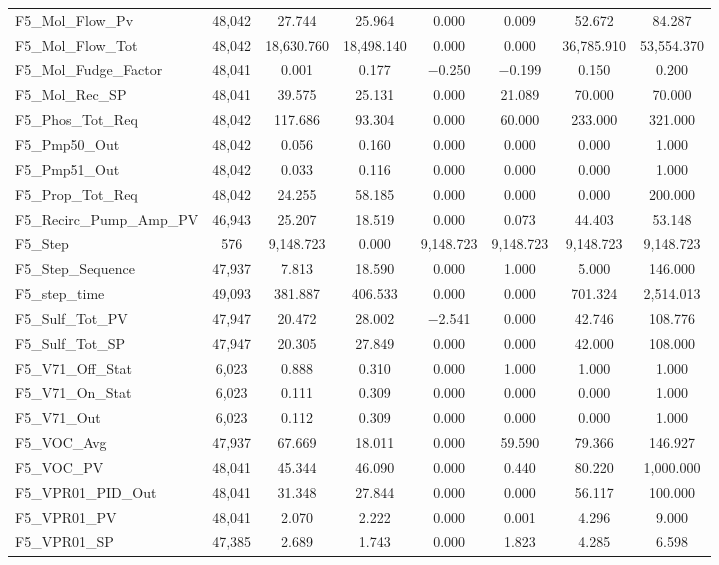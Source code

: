 \begin{table}[!htbp]
{\begin{tabular}{@{\extracolsep{5pt}}lccccccc}
F5\_Mol\_Flow\_Pv & 48,042 & 27.744 & 25.964 & 0.000 & 0.009 & 52.672 & 84.287 \\ 
F5\_Mol\_Flow\_Tot & 48,042 & 18,630.760 & 18,498.140 & 0.000 & 0.000 & 36,785.910 & 53,554.370 \\ 
F5\_Mol\_Fudge\_Factor & 48,041 & 0.001 & 0.177 & $-$0.250 & $-$0.199 & 0.150 & 0.200 \\ 
F5\_Mol\_Rec\_SP & 48,041 & 39.575 & 25.131 & 0.000 & 21.089 & 70.000 & 70.000 \\ 
F5\_Phos\_Tot\_Req & 48,042 & 117.686 & 93.304 & 0.000 & 60.000 & 233.000 & 321.000 \\ 
F5\_Pmp50\_Out & 48,042 & 0.056 & 0.160 & 0.000 & 0.000 & 0.000 & 1.000 \\ 
F5\_Pmp51\_Out & 48,042 & 0.033 & 0.116 & 0.000 & 0.000 & 0.000 & 1.000 \\ 
F5\_Prop\_Tot\_Req & 48,042 & 24.255 & 58.185 & 0.000 & 0.000 & 0.000 & 200.000 \\ 
F5\_Recirc\_Pump\_Amp\_PV & 46,943 & 25.207 & 18.519 & 0.000 & 0.073 & 44.403 & 53.148 \\ 
F5\_Step & 576 & 9,148.723 & 0.000 & 9,148.723 & 9,148.723 & 9,148.723 & 9,148.723 \\ 
F5\_Step\_Sequence & 47,937 & 7.813 & 18.590 & 0.000 & 1.000 & 5.000 & 146.000 \\ 
F5\_step\_time & 49,093 & 381.887 & 406.533 & 0.000 & 0.000 & 701.324 & 2,514.013 \\ 
F5\_Sulf\_Tot\_PV & 47,947 & 20.472 & 28.002 & $-$2.541 & 0.000 & 42.746 & 108.776 \\ 
F5\_Sulf\_Tot\_SP & 47,947 & 20.305 & 27.849 & 0.000 & 0.000 & 42.000 & 108.000 \\ 
F5\_V71\_Off\_Stat & 6,023 & 0.888 & 0.310 & 0.000 & 1.000 & 1.000 & 1.000 \\ 
F5\_V71\_On\_Stat & 6,023 & 0.111 & 0.309 & 0.000 & 0.000 & 0.000 & 1.000 \\ 
F5\_V71\_Out & 6,023 & 0.112 & 0.309 & 0.000 & 0.000 & 0.000 & 1.000 \\ 
F5\_VOC\_Avg & 47,937 & 67.669 & 18.011 & 0.000 & 59.590 & 79.366 & 146.927 \\ 
F5\_VOC\_PV & 48,041 & 45.344 & 46.090 & 0.000 & 0.440 & 80.220 & 1,000.000 \\ 
F5\_VPR01\_PID\_Out & 48,041 & 31.348 & 27.844 & 0.000 & 0.000 & 56.117 & 100.000 \\ 
F5\_VPR01\_PV & 48,041 & 2.070 & 2.222 & 0.000 & 0.001 & 4.296 & 9.000 \\ 
F5\_VPR01\_SP & 47,385 & 2.689 & 1.743 & 0.000 & 1.823 & 4.285 & 6.598 \\ 

\end{tabular}}
\end{table}

